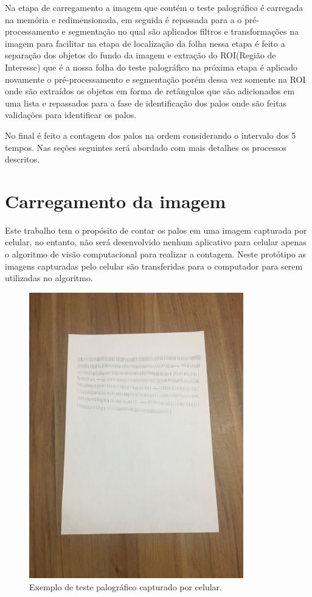 Na etapa de carregamento a imagem que contém o teste palográfico é carregada na memória e redimensionada, em seguida é repassada para a o pré-processamento e segmentação no qual são aplicados filtros e transformações na imagem para facilitar na etapa de localização  da folha nessa etapa é feito a separação dos objetos  do fundo da imagem e extração do ROI(Região de Interesse) que é a nossa folha do teste palográfico na próxima etapa é aplicado novamente o pré-processamento e segmentação porém dessa vez somente na ROI onde são extraídos os objetos em forma de retângulos que são adicionados em uma lista e repassados para a fase de identificação dos palos onde são feitas validações para identificar os palos. 

No final é feito a contagem dos palos na ordem considerando o intervalo dos 5 tempos. Nas seções seguintes será abordado com mais detalhes os processos descritos.

\section{Carregamento da imagem}
\label{sec:carrega-imagem}
Este trabalho tem o propósito de contar os palos em uma imagem capturada por celular, no entanto, não será desenvolvido nenhum aplicativo para celular apenas o algoritmo de visão computacional para realizar a contagem. Neste protótipo as imagens capturadas pelo celular são transferidas para o computador para serem utilizadas no algoritmo. 


\begin{figure}[H]
 \centering
 \includegraphics[width=0.83\textwidth]{./fig/desenvolvimento/teste-palos}
 \caption{Exemplo de teste palográfico capturado por celular.}
 \label{fig:ex-teste-palo}
\end{figure}



